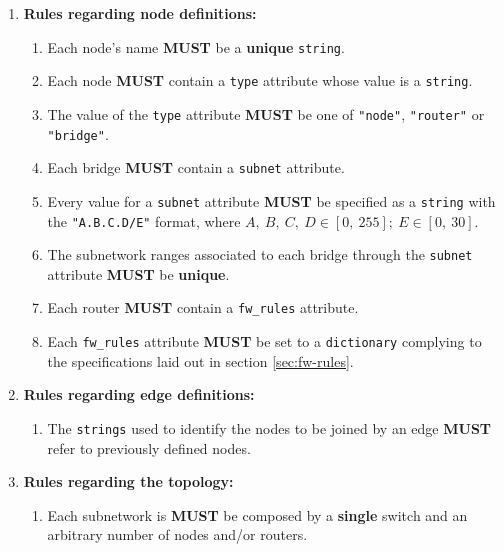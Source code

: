                 \begin{enumerate}
                    \item \textbf{Rules regarding node definitions:}
                    \begin{enumerate}
                        \item Each node's name \textbf{MUST} be a \textbf{unique} \texttt{string}.
                        \item Each node \textbf{MUST} contain a \texttt{type} attribute whose value is a \texttt{string}.
                        \item The value of the \texttt{type} attribute \textbf{MUST} be one of \texttt{"node"}, \texttt{"router"} or \texttt{"bridge"}.
                        \item Each bridge \textbf{MUST} contain a \texttt{subnet} attribute.
                        \item Every value for a \texttt{subnet} attribute \textbf{MUST} be specified as a \texttt{string} with the \texttt{"A.B.C.D/E"} format, where $A,\ B,\ C,\ D \in [0,\ 255];\ E \in [0,\ 30]$.
                        \item The subnetwork ranges associated to each bridge through the \texttt{subnet} attribute \textbf{MUST} be \textbf{unique}.
                        \item Each router \textbf{MUST} contain a \texttt{fw\_rules} attribute.
                        \item Each \texttt{fw\_rules} attribute \textbf{MUST} be set to a \texttt{dictionary} complying to the specifications laid out in section \ref{sec:fw-rules}.
                    \end{enumerate}
                    \item \textbf{Rules regarding edge definitions:}
                    \begin{enumerate}
                        \item The \texttt{strings} used to identify the nodes to be joined by an edge \textbf{MUST} refer to previously defined nodes.
                    \end{enumerate}
                    \item \textbf{Rules regarding the topology:}
                    \begin{enumerate}
                        \item Each subnetwork is \textbf{MUST} be composed by a \textbf{single} switch and an arbitrary number of nodes and/or routers.
                    \end{enumerate}
                \end{enumerate}

